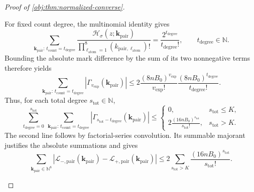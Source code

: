 \documentclass[11pt]{article}
\begin{document}
\begin{proof}[Proof of \cref{obj:thm:normalized-converse}]
\begin{enumerate}
For fixed count degree, the multinomial identity gives
\[
\sum_{\boldsymbol{k}_{\mathrm{pair}}:\,
      t_{\mathrm{count}}=t_{\mathrm{degree}}}
\frac{\mathcal H_\sigma(z;\boldsymbol{k}_{\mathrm{pair}})}
     {\prod_{\ell_{\mathrm{atom}}=1}^{8}
       (k_{\mathrm{pair},\ell_{\mathrm{atom}}})!}
=\frac{2^{t_{\mathrm{degree}}}}{t_{\mathrm{degree}}!},
\qquad t_{\mathrm{degree}}\in\mathbb N.
\]
Bounding the absolute mark difference by the sum of its two nonnegative terms therefore yields
\[
\sum_{\boldsymbol{k}_{\mathrm{pair}}:\,
      t_{\mathrm{count}}=t_{\mathrm{degree}}}
|\Gamma_{v_{\mathrm{exp}}}(\boldsymbol{k}_{\mathrm{pair}})|
\le
2\frac{(8nB_0)^{v_{\mathrm{exp}}}}{v_{\mathrm{exp}}!}
 \frac{(8nB_0)^{t_{\mathrm{degree}}}}{t_{\mathrm{degree}}!}.
\]
Thus, for each total degree \(s_{\mathrm{tot}}\in\mathbb N\),
\[
\sum_{t_{\mathrm{degree}}=0}^{s_{\mathrm{tot}}}
\ \sum_{\boldsymbol{k}_{\mathrm{pair}}:\,
      t_{\mathrm{count}}=t_{\mathrm{degree}}}
|\Gamma_{s_{\mathrm{tot}}-t_{\mathrm{degree}}}(\boldsymbol{k}_{\mathrm{pair}})|
\le
\begin{cases}
0,&s_{\mathrm{tot}}\le K,\\[2mm]
\displaystyle
2\frac{(16nB_0)^{s_{\mathrm{tot}}}}{s_{\mathrm{tot}}!},
&s_{\mathrm{tot}}>K.
\end{cases}
\]
The second line follows by factorial-series convolution. Its summable majorant justifies the absolute summations and gives
\[
\sum_{\boldsymbol{k}_{\mathrm{pair}}\in\mathbb N^8}
\left|
\mathcal L_{-,\mathrm{pair}}(\boldsymbol{k}_{\mathrm{pair}})
-\mathcal L_{+,\mathrm{pair}}(\boldsymbol{k}_{\mathrm{pair}})
\right|
\le
2\sum_{s_{\mathrm{tot}}>K}
\frac{(16nB_0)^{s_{\mathrm{tot}}}}{s_{\mathrm{tot}}!}.
\]


\end{enumerate}
\end{proof}
\end{document}
